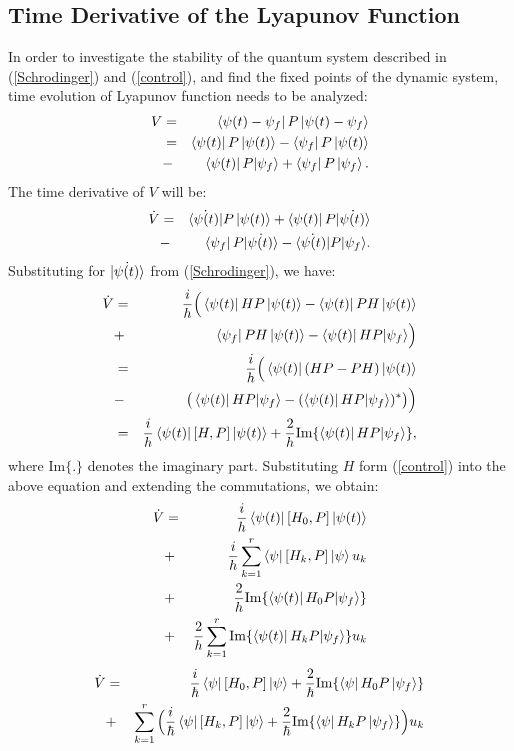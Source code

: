 \documentclass[journal]{IEEEtran}
\theoremstyle{definition}
\begin{document}
\subsection{Time Derivative of the Lyapunov Function}\label{general}

In order to investigate the stability of the quantum system described in (\ref{Schrodinger}) and (\ref{control}), and find the fixed points of the dynamic system, time evolution of Lyapunov function needs to be analyzed:
\begin{eqnarray}
 V&=&\bra{\psi{(t)}-\psi_f}P\ket{\psi{(t)}-\psi_f}\\&=&\bra{\psi{(t)}}P\ket{\psi{(t)}}-\bra{\psi_f}P\ket{\psi{(t)}}\nonumber\\&-&\bra{\psi{(t)}}P{\ket{\psi_{f}}}+\bra{{\psi_f}}P\ket{\psi_f} \nonumber.
\end{eqnarray}
The time derivative of $V$ will be: 
\begin{eqnarray}
\dot{V}&=&\dot{\bra{\psi{(t)}}}P\ket{\psi{(t)}}+\bra{\psi{(t)}}P\dot{\ket{\psi{(t)}}} \\&-&\bra{\psi_f}P\dot{\ket{\psi{(t)}}}-\dot{\bra{\psi{(t)}}}P{\ket{\psi_{f}}}\nonumber.
\end{eqnarray}
Substituting for $\dot{\ket{\psi{(t)}}}$ from (\ref{Schrodinger}), we have:
\begin{eqnarray}
\dot{V}&=&\frac{i}{h} \Big( \bra{\psi{(t)}}HP\ket{\psi{(t)}}-\bra{\psi{(t)}}PH\ket{\psi{(t)}}\\&+& \bra{\psi_f}PH\ket{\psi{(t)}}-\bra{\psi{(t)}}HP{\ket{\psi_{f}}} \Big) 
\nonumber\\&=&\frac{i}{h} \Big( \bra{\psi{(t)}}(HP-PH)\ket{\psi{(t)}} \nonumber\\&-& \big(\bra{\psi{(t)}}HP{\ket{\psi_{f}}} - (\bra{\psi{(t)}}HP{\ket{\psi_{f}}})^*\big) \Big) \nonumber \\ &=&\frac{i}{h}\bra{\psi{(t)}}[H,P]\ket{\psi{(t)}}+\frac{2}{h} \text{Im}\{\bra{\psi{(t)}}HP{\ket{\psi_{f}}}\} \nonumber,
\end{eqnarray}
where $\text{Im}\{.\}$ denotes the imaginary part. Substituting $H$ form (\ref{control}) into the above equation and extending the commutations, we obtain: 
\begin{eqnarray}
\dot{V}&=&\frac{i}{h}\bra{\psi{(t)}}[H_{0},P]\ket{\psi{(t)}} 
\\&+& \frac{i}{h}\displaystyle\sum_{k=1}^{r} {\bra{\psi}[H_k,P]\ket{\psi}u_k} \nonumber
\\&+&\frac{2}{h}\text{Im}\{\bra{\psi{(t)}}H_0P{\ket{\psi_{f}}}\}\nonumber
\\&+&\frac{2}{h}\displaystyle\sum_{k=1}^{r}\text{Im}\{\bra{\psi{(t)}}H_{k}P{\ket{\psi_{f}}}\}u_k \nonumber
\end{eqnarray}
\begin{eqnarray}\label{vdot}
\dot{V}&=&\frac{i}{\hbar}\bra{\psi}[H_0,P]\ket{\psi}+\frac{2}{\hbar}\text{Im}\{\bra{\psi}H_0P\ket{\psi_f}\} 
\\&+& \displaystyle\sum_{k=1}^{r} \Big(\frac{i}{\hbar}\bra{\psi}[H_k,P]\ket{\psi} + \frac{2}{\hbar}\text{Im}\{\bra{\psi}H_k P\ket{\psi_f}\}\Big)u_k \nonumber
\end{eqnarray}
\end{document}
